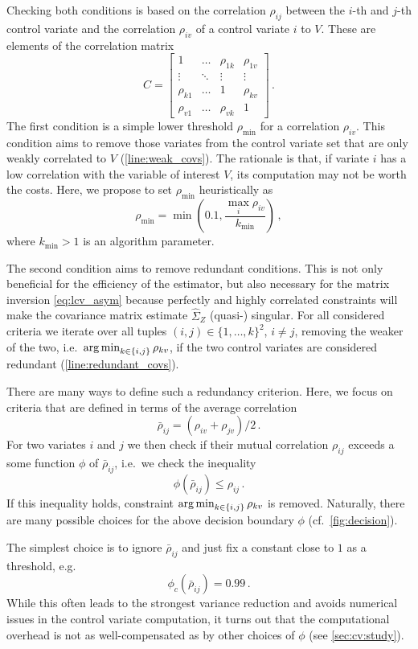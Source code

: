 Checking both conditions is based on the correlation $\rho_{ij}$
between the $i$-th and $j$-th control variate
and the correlation $\rho_{iv}$ of a control variate $i$ to $V$.
These are elements of the correlation matrix
\[
  C=
  \begin{bmatrix}
    1 & \dots & \rho_{1k} & \rho_{1v} \\
    \vdots & \ddots & \vdots & \vdots \\
    \rho_{k1} & \dots & 1 & \rho_{kv} \\
    \rho_{v1} & \dots & \rho_{vk} & 1
  \end{bmatrix}\,.
\]
The first condition is a simple lower threshold $\rho_{\min}$ for a
correlation $\rho_{iv}$.
This condition aims to remove those variates  from the control
variate set that are only weakly correlated to $V$ (\autoref{line:weak_covs}).
The rationale is that, if variate $i$ has a low correlation with the
variable of interest $V$,
its computation may not be worth the costs.
Here, we propose to set $\rho_{\min}$ heuristically as
\[
  \rho_{\min} = \min\left(0.1, \frac{\max_{i}\rho_{iv}}{k_{\min}}\right)\,,
\]
where $k_{\min}>1$ is an algorithm parameter.

The second condition aims to remove redundant conditions.
This is not only beneficial for the efficiency of the estimator, but also
necessary for the matrix inversion \eqref{eq:lcv_asym}
because perfectly and highly correlated constraints will make
the covariance matrix estimate $\hat{\Sigma}_Z$ (quasi-) singular.
For all considered criteria we iterate over all tuples $(i,j)\in
\{1,\dots,k\}^2$, $i\neq j$,
removing the weaker of the two, i.e.\ $\operatorname*{arg\,min}_{k\in\{i,j\}}\rho_{kv}$,
if the two control  variates are considered redundant
(\autoref{line:redundant_covs}).

There are many ways to define such a redundancy criterion.
Here, we focus on criteria that are defined in terms of the
average correlation \[ \bar\rho_{ij}=(\rho_{iv} + \rho_{jv})/2\,.\]
For two variates $i$ and $j$ we then check if their mutual correlation
$\rho_{ij}$ exceeds a some function $\phi$ of ${\bar{\rho}}_{ij}$,
i.e.\ we check the inequality
\[
  \phi(\bar\rho_{ij}) \leq \rho_{ij}\,.
\]
If this inequality holds, constraint $\operatorname*{arg\,min}_{k\in\{i,j\}}\rho_{kv}$
is removed.
Naturally, there are many possible choices for the above decision
boundary $\phi$ (cf.\ \autoref{fig:decision}).

The simplest choice is to ignore $\bar\rho_{ij}$ and just fix a
constant close to $1$ as a threshold,
e.g.\ \[ \phi_c(\bar\rho_{ij})=0.99\,.\] While this often leads to
the strongest variance reduction
and avoids numerical issues in the control variate computation, it turns out
that the computational overhead is not as well-com\-pen\-sa\-ted as
by other choices of $\phi$ (see \autoref{sec:cv:study}).

